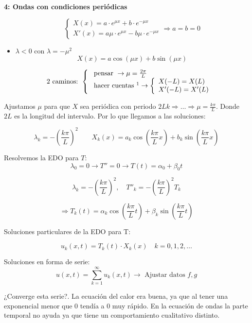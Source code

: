 \begin{example}{\bf 4: Ondas con condiciones periódicas}
\begin{itemize}
					\[\begin{cases}
						X(x) = a\cdot e^{\mu x} + b \cdot e^{-\mu x} \\
						X'(x) = a\mu \cdot e^{\mu x} - b \mu \cdot e^{-\mu x}
					\end{cases}
					\Rightarrow a = b = 0 \]


				\item $\lambda < 0$ con $\lambda = -\mu^2$
					\[ X (x) = a \cos (\mu x) + b \sin (\mu x) \]

					\[\text{2 caminos: }\left\{\begin{array}{l}
						\text{ pensar }\rightarrow \mu = \frac{2\pi}{L} \\
						\text{ hacer cuentas }\footnotemark\rightarrow \left\{ \begin{array}{l}
							X(-L) = X(L) \\
							X'(-L) = X'(L)
						\end{array} \right.
					\end{array}
					\right. \]
			\end{itemize}

			Ajustamos $\mu$ para que $X$ sea periódica con periodo $2L k \Rightarrow … \Rightarrow \mu = \frac{k \pi}{L}$. Donde $2L$ es la longitud del intervalo. Por lo que llegamos a las soluciones:

			\[
			\lambda_k = -\left(\frac{k\pi}{L}\right)^2\quad\quad X_k(x) = a_k \cos \left( \frac{k\pi}{L} x \right) + b_k \sin \left( \frac{k\pi}{L} x \right)
			\]

			Resolvemos la EDO para $T$:
			\[ \lambda_0 = 0 \rightarrow T''=0 \rightarrow T(t) = \alpha_0 + \beta_0 t\]

			\[ \lambda_k = - \left( \frac{k\pi}{L} \right)^2, \quad T''_k = - \left( \frac{k\pi}{L} \right)^2 T_k \]

			\[\Rightarrow T_k(t) = \alpha_k \cos \left( \frac{k\pi}{L} t \right) + \beta_k \sin \left( \frac{k\pi}{L} t \right) \]

			Soluciones particulares de la EDO para T:

			\[u_k (x,t) = T_k(t) \cdot X_k(x) \quad k = 0,1,2,… \]


			Soluciones en forma de serie:
			\[u(x,t) = \sum_{k=1}^{\infty} u_k (x,t) \rightarrow \text{ Ajustar datos } f,g \]

			¿Converge esta serie?. La ecuación del calor era buena, ya que al tener una exponencial menor que 0 tendía a 0 muy rápido. En la ecuación de ondas la parte temporal no ayuda ya que tiene un comportamiento cualitativo distinto.


\end{example}
